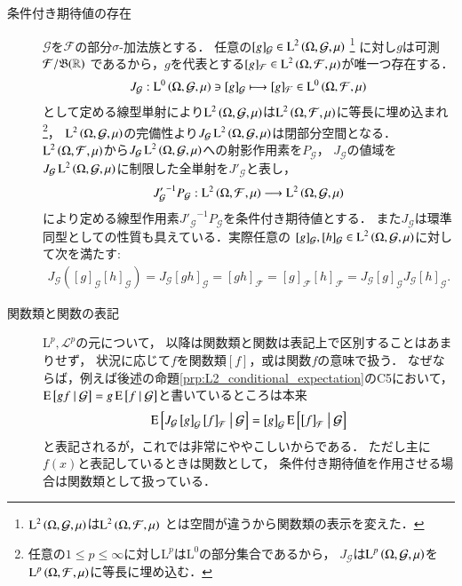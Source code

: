 \begin{description}
	\item[条件付き期待値の存在]
		$\mathcal{G}$を$\mathcal{F}$の部分$\sigma$-加法族とする．
		任意の$[g]_{\mathcal{G}} \in \operatorname{L}^{2} \left(\Omega, \mathcal{G},\mu\right)$
		\footnote{
			$\operatorname{L}^{2} \left(\Omega, \mathcal{G},\mu\right)$は$\operatorname{L}^{2} \left(\Omega, \mathcal{F},\mu\right)$
			とは空間が違うから関数類の表示を変えた．
		}
		に対し$g$は可測$\mathcal{F}/\mathfrak{B}(\mathbb{R})$
		であるから，$g$を代表とする$[g]_{\mathcal{F}} \in \operatorname{L}^{2} \left(\Omega, \mathcal{F},\mu\right)$が唯一つ存在する．
		\begin{align}
			J_{\mathcal{G}}:\operatorname{L}^{0} \left(\Omega, \mathcal{G},\mu\right) \ni [g]_{\mathcal{G}} \longmapsto [g]_{\mathcal{F}} \in \operatorname{L}^{0} \left(\Omega, \mathcal{F},\mu\right)
			\label{eq:Lp_sp_embedding}
		\end{align}
		として定める線型単射により$\operatorname{L}^{2} \left(\Omega, \mathcal{G},\mu\right)$は$\operatorname{L}^{2} \left(\Omega, \mathcal{F},\mu\right)$に等長に埋め込まれ
		\footnote{
			任意の$1 \leq p \leq \infty$に対し$\mathrm{L}^{p}$は$\mathrm{L}^{0}$の部分集合であるから，
			$J_{\mathcal{G}}$は$\operatorname{L}^{p} \left(\Omega, \mathcal{G},\mu\right)$を$\operatorname{L}^{p} \left(\Omega, \mathcal{F},\mu\right)$に等長に埋め込む．
		}，
		$\operatorname{L}^{2} \left(\Omega, \mathcal{G},\mu\right)$の完備性より$J_{\mathcal{G}} \operatorname{L}^{2} \left(\Omega, \mathcal{G},\mu\right)$は閉部分空間となる．
		$\operatorname{L}^{2} \left(\Omega, \mathcal{F},\mu\right)$から$J_{\mathcal{G}} \operatorname{L}^{2} \left(\Omega, \mathcal{G},\mu\right)$への射影作用素を$P_\mathcal{G}$，
		$J_{\mathcal{G}}$の値域を$J_{\mathcal{G}} \operatorname{L}^{2} \left(\Omega, \mathcal{G},\mu\right)$に制限した全単射を$J'_{\mathcal{G}}$と表し，
		\begin{align}
			{J'_{\mathcal{G}}}^{-1} P_{\mathcal{G}}:\operatorname{L}^{2} \left(\Omega, \mathcal{F},\mu\right) \longrightarrow \operatorname{L}^{2} \left(\Omega, \mathcal{G},\mu\right)
			\label{eq:composition_L2_conditional_expectation}
		\end{align}
		により定める線型作用素${J'_{\mathcal{G}}}^{-1} P_{\mathcal{G}}$を条件付き期待値とする．
		また$J_{\mathcal{G}}$は環準同型としての性質も具えている．実際任意の
		$[g]_{\mathcal{G}}, [h]_{\mathcal{G}} \in \operatorname{L}^{2} \left(\Omega, \mathcal{G},\mu\right)$に対して次を満たす:
		\begin{align}
			J_{\mathcal{G}}\left( [g]_{\mathcal{G}} [h]_{\mathcal{G}} \right)
			= J_{\mathcal{G}} [g h]_{\mathcal{G}}
			= [g h]_{\mathcal{F}}
			= [g]_{\mathcal{F}} [h]_{\mathcal{F}}
			= J_{\mathcal{G}} [g]_{\mathcal{G}} J_{\mathcal{G}} [h]_{\mathcal{G}}.
		\end{align}
		
	\item[関数類と関数の表記]
		$\mathrm{L}^p,\mathscr{L}^p$の元について，
		以降は関数類と関数は表記上で区別することはあまりせず，
		状況に応じて$f$を関数類$[f]$，或は関数$f$の意味で扱う．
		なぜならば，例えば後述の命題\ref{prp:L2_conditional_expectation}のC5において，
		$\operatorname{E} \left[ gf \ \middle|\ \mathcal{G} \right] = g\operatorname{E} \left[ f \ \middle|\ \mathcal{G} \right]$と書いているところは本来
		\begin{align}
			\operatorname{E} \left[ J_{\mathcal{G}}\left[g\right]_{\mathcal{G}}\left[f\right]_{\mathcal{F}} \ \middle|\ \mathcal{G} \right] 
			= \left[g\right]_{\mathcal{G}}\operatorname{E} \left[ \left[f\right]_{\mathcal{F}} \ \middle|\ \mathcal{G} \right]
		\end{align}
		と表記されるが，これでは非常にややこしいからである．
		ただし主に$f(x)$と表記しているときは関数として，
		条件付き期待値を作用させる場合は関数類として扱っている．
	\end{description}
	
